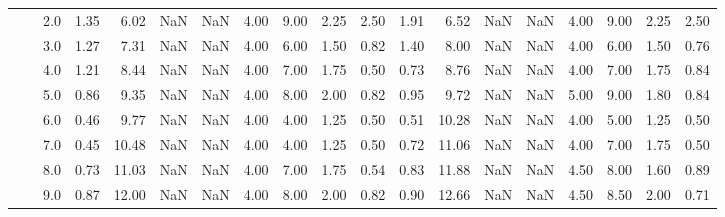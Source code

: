 \begin{tabular}{lllrrrrrrrrrrrrrrrr}
       &     & 2.0  &      1.35 &       6.02 &               NaN &                NaN & 4.00 &   9.00 &             2.25 &                         2.50 &      1.91 &       6.52 &               NaN &                NaN & 4.00 &   9.00 &             2.25 &                         2.50 \\
       &     & 3.0  &      1.27 &       7.31 &               NaN &                NaN & 4.00 &   6.00 &             1.50 &                         0.82 &      1.40 &       8.00 &               NaN &                NaN & 4.00 &   6.00 &             1.50 &                         0.76 \\
       &     & 4.0  &      1.21 &       8.44 &               NaN &                NaN & 4.00 &   7.00 &             1.75 &                         0.50 &      0.73 &       8.76 &               NaN &                NaN & 4.00 &   7.00 &             1.75 &                         0.84 \\
       &     & 5.0  &      0.86 &       9.35 &               NaN &                NaN & 4.00 &   8.00 &             2.00 &                         0.82 &      0.95 &       9.72 &               NaN &                NaN & 5.00 &   9.00 &             1.80 &                         0.84 \\
       &     & 6.0  &      0.46 &       9.77 &               NaN &                NaN & 4.00 &   4.00 &             1.25 &                         0.50 &      0.51 &      10.28 &               NaN &                NaN & 4.00 &   5.00 &             1.25 &                         0.50 \\
       &     & 7.0  &      0.45 &      10.48 &               NaN &                NaN & 4.00 &   4.00 &             1.25 &                         0.50 &      0.72 &      11.06 &               NaN &                NaN & 4.00 &   7.00 &             1.75 &                         0.50 \\
       &     & 8.0  &      0.73 &      11.03 &               NaN &                NaN & 4.00 &   7.00 &             1.75 &                         0.54 &      0.83 &      11.88 &               NaN &                NaN & 4.50 &   8.00 &             1.60 &                         0.89 \\
       &     & 9.0  &      0.87 &      12.00 &               NaN &                NaN & 4.00 &   8.00 &             2.00 &                         0.82 &      0.90 &      12.66 &               NaN &                NaN & 4.50 &   8.50 &             2.00 &                         0.71 \\

\end{tabular}
